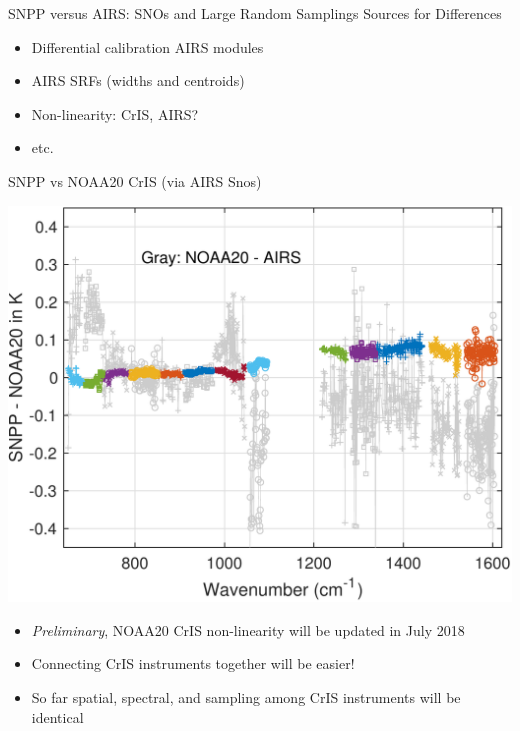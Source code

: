 \documentclass[10pt,t]{beamer}
\begin{document}
\begin{frame}[label={sec:orgdf10d64}]{SNPP versus AIRS: SNOs and Large Random Samplings}
\small
Sources for Differences
\vspace{-0.05in}
\begin{itemize}
\item Differential calibration AIRS modules
\item AIRS SRFs (widths and centroids)
\item Non-linearity: CrIS, AIRS?
\item etc.
\end{itemize}
\end{frame}

\begin{frame}[label={sec:org1908e31}]{SNPP vs NOAA20 CrIS (via AIRS Snos)}
\vspace{-0.1in}

\begin{center}
\includegraphics[width=0.65\linewidth]{./Figs/Pdf/sno_march2018_snpp_minus_noaa20_with_c2_airs_ingrey.pdf}
\end{center}

\vspace{-0.1in}

\small
\begin{itemize}
\item \emph{Preliminary}, NOAA20 CrIS non-linearity will be updated in July 2018
\item Connecting CrIS instruments together will be easier!
\item So far spatial, spectral, and sampling among CrIS instruments will be identical
\end{itemize}
\end{frame}
\end{document}
